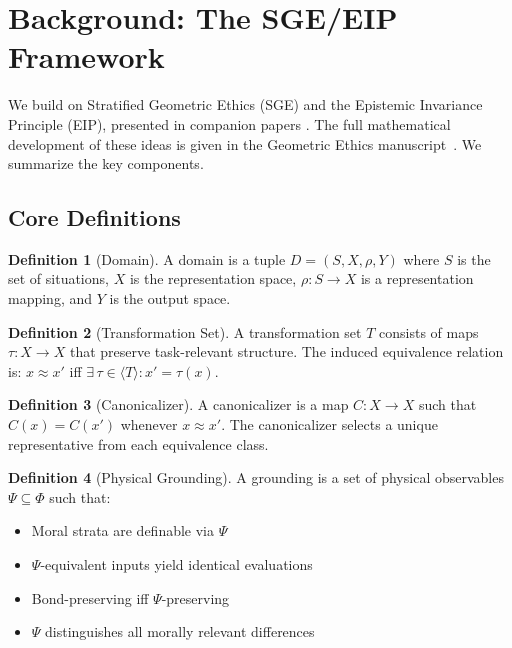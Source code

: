 \documentclass[12pt]{article}
\theoremstyle{definition}
\newtheorem{definition}{Definition}[section]
\begin{document}
\section{Background: The SGE/EIP Framework}

We build on Stratified Geometric Ethics (SGE) and the Epistemic Invariance Principle (EIP), presented in companion papers \cite{bond2025sge, bond2025eip}. The full mathematical development of these ideas is given in the Geometric Ethics manuscript~\cite{bond2026ge}. We summarize the key components.

\subsection{Core Definitions}

\begin{definition}[Domain]
A domain is a tuple $D = (S, X, \rho, Y)$ where $S$ is the set of situations, $X$ is the representation space, $\rho\colon S \to X$ is a representation mapping, and $Y$ is the output space.
\end{definition}

\begin{definition}[Transformation Set]
A transformation set $T$ consists of maps $\tau\colon X \to X$ that preserve task-relevant structure. The induced equivalence relation is: $x \approx x'$ iff $\exists\, \tau \in \langle T \rangle\colon x' = \tau(x)$.
\end{definition}

\begin{definition}[Canonicalizer]
A canonicalizer is a map $C\colon X \to X$ such that $C(x) = C(x')$ whenever $x \approx x'$. The canonicalizer selects a unique representative from each equivalence class.
\end{definition}

\begin{definition}[Physical Grounding]
A grounding is a set of physical observables $\Psi \subseteq \Phi$ such that:
\begin{itemize}
    \item[\textup{(G1)}] Moral strata are definable via $\Psi$
    \item[\textup{(G2)}] $\Psi$-equivalent inputs yield identical evaluations
    \item[\textup{(G3)}] Bond-preserving iff $\Psi$-preserving
    \item[\textup{(G4)}] $\Psi$ distinguishes all morally relevant differences
\end{itemize}
\end{definition}
\end{document}
